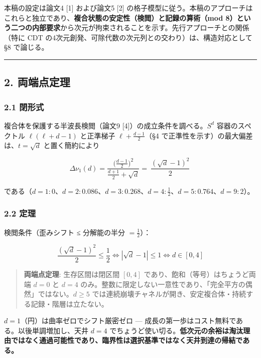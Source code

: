 \documentclass[
]{ltjsarticle}
\begin{document}
本稿の設定は論文4 {[}1{]} および論文5 {[}2{]}
の格子模型に従う。本稿のアプローチはこれらと独立であり、\textbf{複合状態の安定性（検閲）と記録の算術（mod
8）という二つの内部要求}から次元が拘束されることを示す。先行アプローチとの関係（特に
CDT の4次元創発、可除代数の次元列との交わり）は、構造対応として §8
で論じる。

\begin{center}\rule{0.5\linewidth}{0.5pt}\end{center}

\subsection{2. 両端点定理}\label{ux4e21ux7aefux70b9ux5b9aux7406}

\subsubsection{2.1 閉形式}\label{ux9589ux5f62ux5f0f}

複合体を保護する半波長検閲（論文9 {[}4{]}）の成立条件を調べる。\(S^d\)
容器のスペクトル \(\ell(\ell+d-1)\) と正準梯子 \(\ell+\tfrac{d-1}2\)（§4
で正準性を示す）の最大偏差は、\(t=\sqrt d\) と置く簡約により

\[
\Delta\nu_1(d)=\frac{\bigl(\tfrac{d-1}2\bigr)^2}{\tfrac{d+1}2+\sqrt d}=\boxed{\ \frac{(\sqrt d-1)^2}{2}\ }
\]

である（\(d=1:0\)、\(d=2:0.086\)、\(d=3:0.268\)、\(d=4:\tfrac12\)、\(d=5:0.764\)、\(d=9:2\)）。

\subsubsection{2.2 定理}\label{ux5b9aux7406}

検閲条件（歪みシフト ≤ 分解能の半分 \(=\tfrac12\)）：

\[
\frac{(\sqrt d-1)^2}{2}\le\frac12\iff|\sqrt d-1|\le1\iff d\in[0,4]
\]

\begin{quote}
\textbf{両端点定理}: 生存区間は閉区間 \([0,4]\)
であり、飽和（等号）はちょうど両端 \(d=0\) と \(d=4\)
のみ。整数に限定しない一意性であり、「完全平方の偶然」ではない。\(d\ge5\)
では連続崩壊チャネルが開き、安定複合体・持続する記録・階層は立たない。
\end{quote}

\(d=1\)（円）は曲率ゼロでシフト厳密ゼロ ---
成長の第一歩はコスト無料である。以後単調増加し、天井 \(d=4\)
でちょうど使い切る。\textbf{低次元の余裕は淘汰理由ではなく通過可能性であり、臨界性は選択基準ではなく天井到達の帰結である。}
\end{document}
